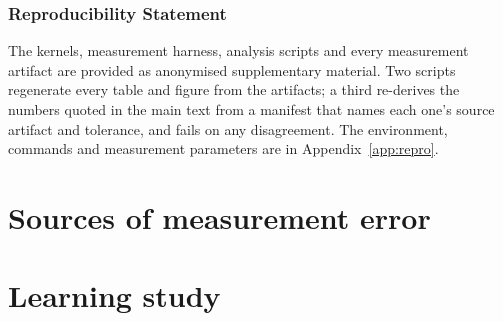 \documentclass[10pt]{article} %
\begin{document}
\subsubsection*{Reproducibility Statement}
The kernels, measurement harness, analysis scripts and every measurement
artifact are provided as anonymised supplementary material. Two scripts
regenerate every table and figure from the artifacts; a third re-derives the
numbers quoted in the main text from a manifest that names each one's source
artifact and tolerance, and fails on any disagreement. The environment, commands
and measurement parameters are in Appendix~\ref{app:repro}.

\makeatletter
\if@accepted

\fi
\makeatother




\clearpage
\appendix



\section{Sources of measurement error}
\label{sec:pitfalls}


\section{Learning study}
\label{sec:training}



\end{document}
